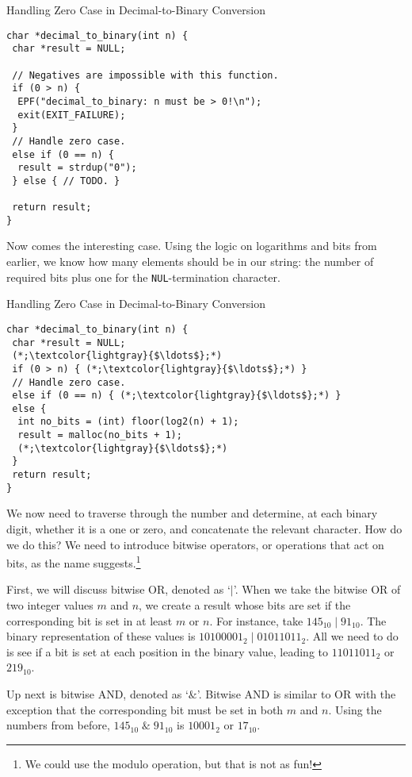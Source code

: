 \begin{cl}[main.c]{Handling Zero Case in Decimal-to-Binary Conversion}\begin{lstlisting}[language=MyC]
char *decimal_to_binary(int n) {
 char *result = NULL;
    
 // Negatives are impossible with this function.
 if (0 > n) {
  EPF("decimal_to_binary: n must be > 0!\n");
  exit(EXIT_FAILURE);
 }
 // Handle zero case.    
 else if (0 == n) {
  result = strdup("0");
 } else { // TODO. }

 return result;
}   
\end{lstlisting}\end{cl}

Now comes the interesting case. Using the logic on logarithms and bits from earlier, we know how many elements should be in our string: the number of required bits plus one for the \texttt{NUL}-termination character.

\begin{cl}[main.c]{Handling Zero Case in Decimal-to-Binary Conversion}\begin{lstlisting}[language=MyC]
char *decimal_to_binary(int n) {
 char *result = NULL;
 (*;\textcolor{lightgray}{$\ldots$};*)
 if (0 > n) { (*;\textcolor{lightgray}{$\ldots$};*) }
 // Handle zero case.    
 else if (0 == n) { (*;\textcolor{lightgray}{$\ldots$};*) } 
 else {
  int no_bits = (int) floor(log2(n) + 1);
  result = malloc(no_bits + 1);
  (*;\textcolor{lightgray}{$\ldots$};*)
 }
 return result;
}   
\end{lstlisting}\end{cl}

We now need to traverse through the number and determine, at each binary digit, whether it is a one or zero, and concatenate the relevant character. How do we do this? We need to introduce bitwise operators, or operations that act on bits, as the name suggests.\footnote{We could use the modulo operation, but that is not as fun!}

First, we will discuss bitwise OR, denoted as `$|$'. When we take the bitwise OR of two integer values $m$ and $n$, we create a result whose bits are set if the corresponding bit is set in at least $m$ or $n$. For instance, take $145_{10}\;|\;91_{10}$. The binary representation of these values is $10100001_{2}\;|\;01011011_{2}$. All we need to do is see if a bit is set at each position in the binary value, leading to $11011011_{2}$ or $219_{10}$. 

Up next is bitwise AND, denoted as `$\&$'. Bitwise AND is similar to OR with the exception that the corresponding bit must be set in both $m$ and $n$. Using the numbers from before, $145_{10}\;\&\;91_{10}$ is $10001_{2}$ or $17_{10}$.


